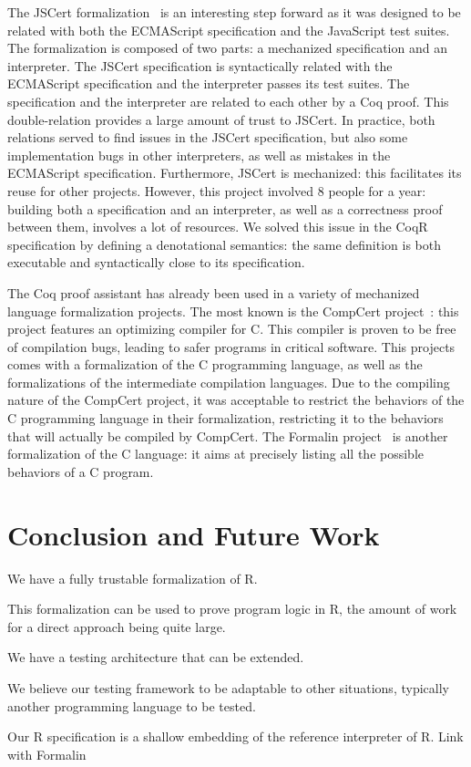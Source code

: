 \documentclass[
    sigplan,
    10pt,
    review, %
    natbib=false %
 ]{acmart}
\begin{document}
The JSCert formalization~\parencite{popl14jscert}
is an interesting step forward as it was designed
to be related with both the ECMAScript specification and the JavaScript test suites.
The formalization is composed of two parts:
a mechanized specification and an interpreter.
The JSCert specification is syntactically related with the ECMAScript specification
and the interpreter passes its test suites.
The specification and the interpreter are related to each other by a Coq proof.
This double-relation provides a large amount of trust to JSCert.
In practice, both relations served to find issues in the JSCert specification,
but also some implementation bugs in other interpreters,
as well as mistakes in the ECMAScript specification.
Furthermore, JSCert is mechanized:
this facilitates its reuse for other projects.
However, this project involved 8 people for a year:
building both a specification and an interpreter,
as well as a correctness proof between them, involves a lot of resources.
We solved this issue in the CoqR specification
by defining a denotational semantics:
the same definition is both executable and syntactically close to its specification.

The Coq proof assistant has already been used
in a variety of mechanized language formalization projects.
The most known is the CompCert project~\cite{Leroy-Compcert-CACM}:
this project features an optimizing compiler for C.
This compiler is proven to be free of compilation bugs,
leading to safer programs in critical software.
This projects comes with a formalization of the C programming language,
as well as the formalizations of the intermediate compilation languages.
%
Due to the compiling nature of the CompCert project,
it was acceptable to restrict the behaviors of the C programming language
in their formalization,
restricting it to the behaviors that will actually be compiled by CompCert.
The Formalin project~\parencite{formalin} is another formalization
of the C language:
it aims at precisely listing all the possible behaviors of a C program.

\section{Conclusion and Future Work}
\label{sec:conclusion}

We have a fully trustable formalization of R.

This formalization can be used to prove program logic in R,
the amount of work for a direct approach being quite large.

We have a testing architecture that can be extended.

We believe our testing framework to be adaptable to other situations,
typically another programming language to be tested.

Our R specification is a shallow embedding of the reference interpreter of R.
Link with Formalin

\printbibliography{}
\end{document}
